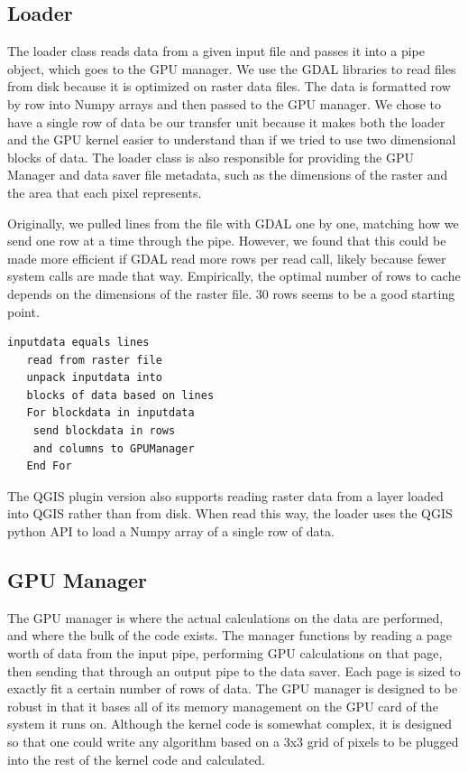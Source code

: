\documentclass[journal]{IEEEtran}
\begin{document}
    \subsection{Loader}
    The loader class reads data from a given input file and passes it into
    a pipe object, which goes to the GPU manager. We use the GDAL libraries to
    read files from disk because it is optimized on raster data files. The data is
    formatted row by row into Numpy arrays and then passed to the GPU manager.
    We chose to have a single row of data be our transfer unit because it makes
    both the loader and the GPU kernel easier to understand than if we tried to
    use two dimensional blocks of data. The loader class is also responsible
    for providing the GPU Manager and data saver file metadata, such as the
    dimensions of the raster and the area that each pixel represents.

    Originally, we pulled lines from the file with GDAL one by one, matching
    how we send one row at a time through the pipe. However, we found that this
    could be made more efficient if GDAL read more rows per read call, likely
    because fewer system calls are made that way. Empirically, the optimal number
    of rows to cache depends on the dimensions of the raster file. 30 rows seems
    to be a good starting point.

\begin{Verbatim}[frame=single, gobble=2]
   inputdata equals lines 
   read from raster file
   unpack inputdata into 
   blocks of data based on lines
   For blockdata in inputdata
   	send blockdata in rows 
	and columns to GPUManager
   End For	
\end{Verbatim}

    The QGIS plugin version also supports reading raster data from a layer loaded
    into QGIS rather than from disk. When read this way, the loader uses the QGIS
    python API to load a Numpy array of a single row of data.

    \subsection{GPU Manager}
    The GPU manager is where the actual calculations on the data are performed,
    and where the bulk of the code exists. The manager functions by reading a
    page worth of data from the input pipe, performing GPU calculations on that
    page, then sending that through an output pipe to the data saver. Each page
    is sized to exactly fit a certain number of rows of data. The GPU manager
    is designed to be robust in that it bases all of its memory management on
    the GPU card of the system it runs on. Although the kernel code is somewhat
    complex, it is designed so that one could write any algorithm based on a
    3x3 grid of pixels to be plugged into the rest of the kernel code and calculated.
\end{document}
